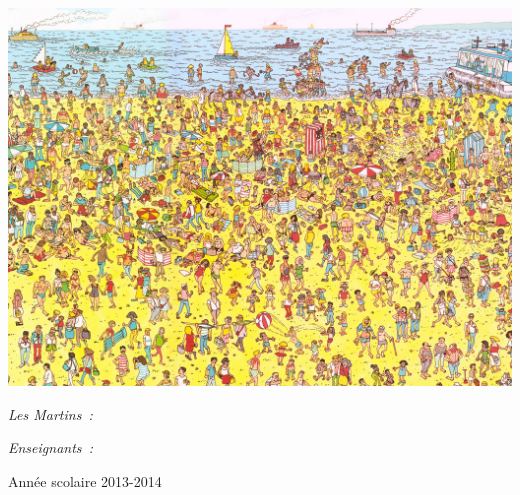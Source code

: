 \begin{center}
	\includegraphics [scale=0.30]{images/ou-est-charlie-plage.jpg} \\[0.7cm]
	\begin{minipage}[t]{0.4\textwidth}
	  \begin{flushleft} \large
	    \emph{Les Martins~:}\\
	    \small \reportauthor
	  \end{flushleft}
	\end{minipage}
	\begin{minipage}[t]{0.5\textwidth}
	  \begin{flushright} \large
	    \emph{Enseignants~:} \\
	    \enseignants
	  \end{flushright}
	\end{minipage}

	\vfill
	\footnotesize{Année scolaire 2013-2014}
\end{center}
